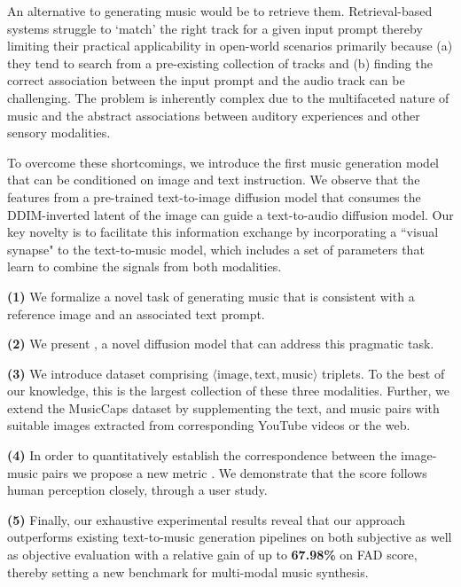 An alternative to generating music would be to retrieve them. Retrieval-based systems \cite{mulan, manco2022contrastive} struggle to `match' the right track for a given input prompt thereby limiting their practical applicability in open-world scenarios primarily because (a) they tend to search from a pre-existing collection of tracks and (b) finding the correct association between the input prompt and the audio track can be challenging. 
The problem is inherently complex due to the multifaceted nature of music and the abstract associations between auditory experiences and other sensory modalities. 

To overcome these shortcomings, we introduce the first music generation model that can be conditioned on image and text instruction. We observe that the features from a pre-trained text-to-image diffusion model that consumes the DDIM-inverted latent of the image can guide a text-to-audio diffusion model. Our key novelty is to facilitate this information exchange by incorporating a ``visual synapse" to the text-to-music model, which includes a set of parameters that learn to combine the signals from both modalities. 


\textbf{(1)} We formalize a novel task of generating music that is consistent with a reference image and an associated text prompt.

\textbf{(2)} We present \modelname, a novel diffusion model that can address this pragmatic task.  

\textbf{(3)} We introduce \ourdataset dataset comprising \ourdatasetsize $\langle \text{image}, \text{text}, \text{music} \rangle$ triplets. To the best of our knowledge, this is the largest collection of these three modalities. Further, we extend the MusicCaps \cite{musiclm} dataset by supplementing the text, and music pairs with suitable images extracted from corresponding YouTube videos or the web. 

\textbf{(4)} In order to quantitatively establish the correspondence between the image-music pairs we propose a new metric \imagemusicmetric. We demonstrate that the score follows human perception closely, through a user study.  

\textbf{(5)} Finally, our exhaustive experimental results reveal that our approach outperforms existing text-to-music generation pipelines on both subjective as well as objective evaluation with a relative gain of up to \textbf{67.98\%} on FAD score, thereby setting a new benchmark for multi-modal music synthesis.

